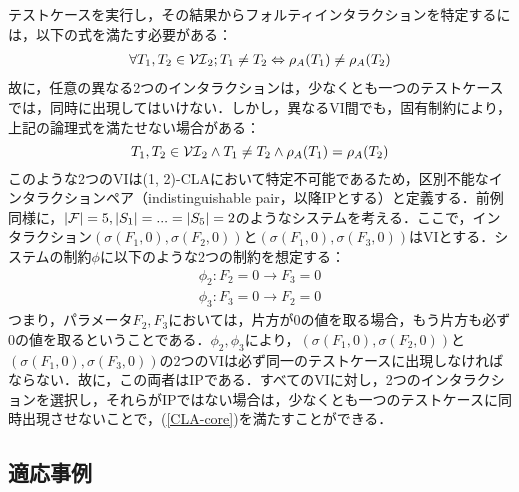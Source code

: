 \documentclass[paper]{ieicej}
\begin{document}
\begin{itemize}
テストケースを実行し，その結果からフォルティインタラクションを特定するには，以下の式を満たす必要がある：
\begin{eqnarray}
\label{CLA-core}
\forall T_1, T_2\in {\cal VI}_2; T_1 \not= T_2\Leftrightarrow\rho_A(T_1) \not= \rho_A(T_2)
\end{eqnarray}
故に，任意の異なる2つのインタラクションは，少なくとも一つのテストケースでは，同時に出現してはいけない．しかし，異なるVI間でも，固有制約により，上記の論理式を満たせない場合がある：
\[
T_1, T_2\in {\cal VI}_2\land T_1 \not= T_2\land\rho_A(T_1) = \rho_A(T_2)\nonumber
\]
このような2つのVIは(1, 2)-CLAにおいて特定不可能であるため，区別不能なインタラクションペア（indistinguishable pair，以降IPとする）と定義する．前例同様に，$|{\cal F}|=5, |S_1|=...=|S_5|=2$のようなシステムを考える．ここで，インタラクション$(\sigma(F_1, 0), \sigma(F_2, 0))$と$(\sigma(F_1, 0), \sigma(F_3, 0))$はVIとする．システムの制約$\phi$に以下のような2つの制約を想定する：
\begin{eqnarray}
\phi_2 : F_2 = 0 \to F_3 = 0
\end{eqnarray}
\begin{eqnarray}
\phi_3 : F_3 = 0 \to F_2 = 0
\end{eqnarray}
つまり，パラメータ$F_2, F_3$においては，片方が0の値を取る場合，もう片方も必ず0の値を取るということである．$\phi_2, \phi_3$により，$(\sigma(F_1, 0), \sigma(F_2, 0))$と$(\sigma(F_1, 0), \sigma(F_3, 0))$の2つのVIは必ず同一のテストケースに出現しなければならない．故に，この両者はIPである．すべてのVIに対し，2つのインタラクションを選択し，それらがIPではない場合は，少なくとも一つのテストケースに同時出現させないことで，(\ref{CLA-core})を満たすことができる．

\end{itemize}
\subsection{適応事例}
\label{subsec:example}
\end{document}
